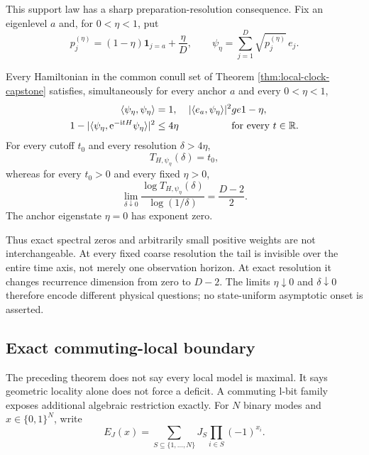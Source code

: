 This support law has a sharp preparation-resolution consequence.  Fix an
eigenlevel $a$ and, for $0<\eta<1$, put
\begin{equation}
 p_j^{(\eta)}=(1-\eta)\mathbf 1_{j=a}+\frac{\eta}{D},
 \qquad
 \psi_\eta=\sum_{j=1}^D\sqrt{p_j^{(\eta)}}\,e_j.
 \label{eq:vanishing-tail-state}
\end{equation}

\begin{corollary}
\label{cor:vanishing-tail}
Every Hamiltonian in the common conull set of Theorem
\ref{thm:local-clock-capstone} satisfies, simultaneously for every anchor
$a$ and every $0<\eta<1$,
\begin{align}
 \langle\psi_\eta,\psi_\eta\rangle&=1,
 &|\langle e_a,\psi_\eta\rangle|^2&ge1-\eta,
 \label{eq:vanishing-tail-state-close}\\
 1-|\langle\psi_\eta,\mathrm e^{-\mathrm i tH}\psi_\eta\rangle|^2&\le4\eta
 &&\text{for every }t\in\mathbb R.                         \label{eq:vanishing-tail-uniform}
\end{align}
For every cutoff $t_0$ and every resolution $\delta>4\eta$,
\begin{equation}
 T_{H,\psi_\eta}(\delta)=t_0,                        \label{eq:vanishing-tail-coarse}
\end{equation}
whereas for every $t_0>0$ and every fixed $\eta>0$,
\begin{equation}
 \lim_{\delta\downarrow0}
 \frac{\log T_{H,\psi_\eta}(\delta)}{\log(1/\delta)}
 =\frac{D-2}{2}.                                    \label{eq:vanishing-tail-exponent}
\end{equation}
The anchor eigenstate $\eta=0$ has exponent zero.
\end{corollary}

Thus exact spectral zeros and arbitrarily small positive weights are not
interchangeable.  At every fixed coarse resolution the tail is invisible
over the entire time axis, not merely one observation horizon.  At exact
resolution it changes recurrence dimension from zero to $D-2$.  The limits
$\eta\downarrow0$ and $\delta\downarrow0$ therefore encode different physical
questions; no state-uniform asymptotic onset is asserted.

\subsection{Exact commuting-local boundary}

The preceding theorem does not say every local model is maximal.  It says
geometric locality alone does not force a deficit.  A commuting l-bit family
exposes additional algebraic restriction exactly.  For $N$ binary modes and
$x\in\{0,1\}^N$, write
\begin{equation}
 E_J(x)=\sum_{S\subseteq\{1,\ldots,N\}}J_S
       \prod_{i\in S}(-1)^{x_i}.                         \label{eq:lbit-energy-main}
\end{equation}

